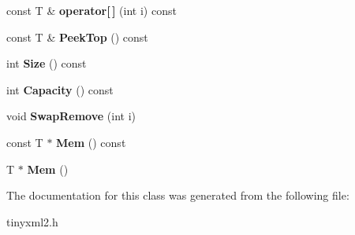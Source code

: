 \begin{DoxyCompactItemize}
const T \& {\bfseries operator\mbox{[}$\,$\mbox{]}} (int i) const
\item 
\mbox{\label{classtinyxml2_1_1_dyn_array_a5e4e1e408e646688503dec77c77c9d59}} 
const T \& {\bfseries Peek\+Top} () const
\item 
\mbox{\label{classtinyxml2_1_1_dyn_array_a67614d80847eb92cab330f1a5849a9a2}} 
int {\bfseries Size} () const
\item 
\mbox{\label{classtinyxml2_1_1_dyn_array_a8e101fdf5b4248ac119d7dca6d0f5421}} 
int {\bfseries Capacity} () const
\item 
\mbox{\label{classtinyxml2_1_1_dyn_array_aa72c644f8b5e9ec5dab5b66c88f5665f}} 
void {\bfseries Swap\+Remove} (int i)
\item 
\mbox{\label{classtinyxml2_1_1_dyn_array_a60b33e61cf10b3fd900ee46692dc0fe9}} 
const T $\ast$ {\bfseries Mem} () const
\item 
\mbox{\label{classtinyxml2_1_1_dyn_array_a2f0842cd666e2ad951f1a8bd6561fa40}} 
T $\ast$ {\bfseries Mem} ()
\end{DoxyCompactItemize}


The documentation for this class was generated from the following file\+:\begin{DoxyCompactItemize}
\item 
tinyxml2.\+h\end{DoxyCompactItemize}
